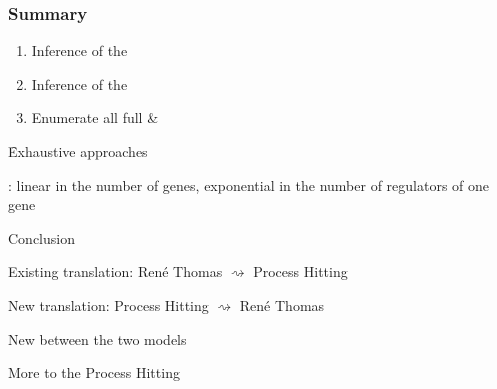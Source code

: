 \begin{frame}[c]
  \frametitle{Summary}

\begin{enumerate}[1.]
  \item Inference of the 
  \item Inference of the 
  \item Enumerate all full \& 
\end{enumerate}
\quad\quad\f Exhaustive approaches

\bigskip
{}: linear in the number of genes, exponential in the number of regulators of one gene

\pause
\bigskip
\begin{flushright}
\Large
\textcolor{couleurtheme}{Conclusion}\hspace*{2.7em}
\end{flushright}

\medskip
Existing translation: René Thomas $\rightsquigarrow$ Process Hitting

\smallskip
New translation: Process Hitting $\rightsquigarrow$ René Thomas

\smallskip
\begin{fleches}
  \item New  between the two models
  \item More  to the Process Hitting
\end{fleches}
\end{frame}



